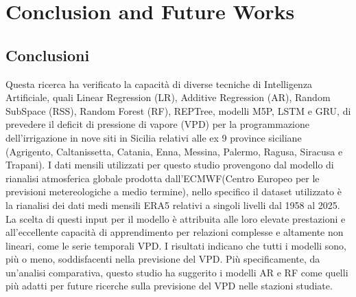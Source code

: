 \chapter{Conclusion and Future Works}
\section{Conclusioni}
Questa ricerca ha verificato la capacità di diverse tecniche di Intelligenza Artificiale, quali Linear Regression (LR), Additive Regression (AR), Random SubSpace (RSS), Random Forest (RF), REPTree, modelli M5P, LSTM e GRU, di prevedere il deficit di pressione di vapore (VPD) per la programmazione dell'irrigazione in nove siti in Sicilia relativi alle ex 9 province siciliane (Agrigento, Caltanissetta, Catania, Enna, Messina, Palermo, Ragusa, Siracusa e Trapani). I dati mensili utilizzati per questo studio provengono dal modello di rianalisi atmosferica globale prodotta dall'ECMWF(Centro Europeo per le previsioni metereologiche a medio termine), nello specifico il dataset utilizzato è la rianalisi dei dati medi mensili ERA5 relativi a singoli livelli dal 1958 al 2025.
La scelta di questi input per il modello è attribuita alle loro elevate prestazioni e all'eccellente capacità di apprendimento per relazioni complesse e altamente non lineari, come le serie temporali VPD. I risultati indicano che tutti i modelli sono, più o meno, soddisfacenti nella previsione del VPD. Più specificamente, da un'analisi comparativa, questo studio ha suggerito i modelli AR e RF come quelli più adatti per future ricerche sulla previsione del VPD nelle stazioni studiate.\\
